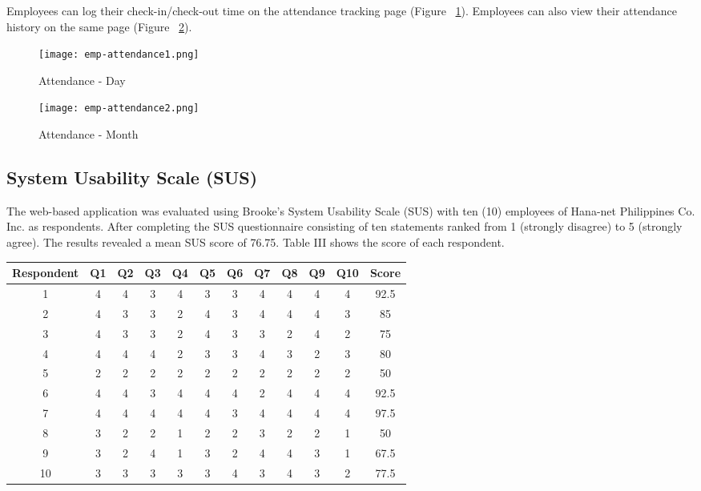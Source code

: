 \documentclass{icsthesis}
\begin{document}
\begin{mainmatter}
Employees can log their check-in/check-out time on the attendance tracking page (Figure ~\ref{fig:emp-attndnce1}). Employees can also view their attendance history on the same page (Figure ~\ref{fig:emp-attndnce2}).
\begin{figure}[H]
    \centering
    \texttt{[image: emp-attendance1.png]}
    \caption{Attendance - Day }

        \label{fig:emp-attndnce1}
\end{figure}
\begin{figure}[H]
        \centering
        \texttt{[image: emp-attendance2.png]}
        \caption{Attendance - Month}
        \label{fig:emp-attndnce2}
    \end{figure}

\subsection{\textbf{System Usability Scale (SUS)}}
The web-based application was evaluated using Brooke's System Usability Scale (SUS) with ten (10) employees of Hana-net Philippines Co. Inc. as respondents. After completing the SUS questionnaire consisting of ten statements ranked from 1 (strongly disagree) to 5 (strongly agree). The results revealed a mean SUS score of 76.75. Table III shows the score of each respondent.\\
\begin{table}[H]
\centering
\small
\setlength{\tabcolsep}{3pt} 
\begin{tabular}{|c |c |c |c |c |c |c |c |c |c |c |c|} \hline 
Respondent & Q1 & Q2 & Q3 & Q4 & Q5 & Q6 & Q7 & Q8 & Q9 & Q10 & Score \\ \hline 
1 & 4 & 4 & 3 & 4 & 3 & 3 & 4 & 4 & 4 & 4 & 92.5 \\ \hline 
2 & 4 & 3 & 3 & 2 & 4 & 3 & 4 & 4 & 4 & 3 & 85 \\ \hline 
3 & 4 & 3 & 3 & 2 & 4 & 3 & 3 & 2 & 4 & 2 & 75 \\ \hline 
4 & 4 & 4 & 4 & 2 & 3 & 3 & 4 & 3 & 2 & 3 & 80 \\ \hline 
5 & 2 & 2 & 2 & 2 & 2 & 2 & 2 & 2 & 2 & 2 & 50 \\ \hline 
6 & 4 & 4 & 3 & 4 & 4 & 4 & 2 & 4 & 4 & 4 & 92.5 \\ \hline 
7 & 4 & 4 & 4 & 4 & 4 & 3 & 4 & 4 & 4 & 4 & 97.5 \\ \hline 
8 & 3 & 2 & 2 & 1 & 2 & 2 & 3 & 2 & 2 & 1 & 50 \\ \hline 
9 & 3 & 2 & 4 & 1 & 3 & 2 & 4 & 4 & 3 & 1 & 67.5 \\ \hline 
10 & 3 & 3 & 3 & 3 & 3 & 4 & 3 & 4 & 3 & 2 & 77.5 \\ \hline


\end{tabular}
\end{table}
\end{mainmatter}
\end{document}
